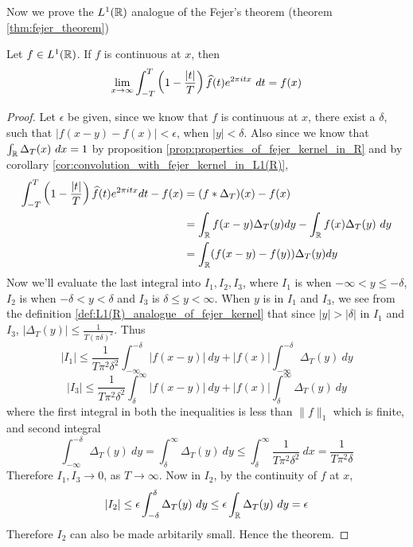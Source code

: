 Now we prove the $L^1(\mathbb R)$ analogue of the Fejer's theorem (theorem \ref{thm:fejer_theorem})
\begin{theorem}
  \label{thm:L1(R)_analogue_of_fejer_theorem}
  Let $f \in L^1(\mathbb R)$. If $f$ is continuous at $x$, then $$\lim_{x \to \infty} \int_{-T}^{T}\left(1-\frac{|t|}{T}\right)\widehat{f}(t)e^{2\pi itx} \ dt = f(x)$$
\end{theorem}
\begin{proof}
  Let $\epsilon$ be given, since we know that $f$ is continuous at $x$, there exist a $\delta$, such that $|f(x-y) - f(x)| < \epsilon$, when $|y| < \delta$. Also since we know that $\int_\R \Delta_T(x) \ dx = 1$ by proposition \ref{prop:properties_of_fejer_kernel_in_R} and by corollary \ref{cor:convolution_with_fejer_kernel_in_L1(R)},
  \begin{align*}
    \int_{-T}^T\left(1-\frac{|t|}{T}\right)\widehat{f}(t)e^{2\pi itx} dt - f(x) &= (f*\Delta_T)(x) - f(x) \\
     &= \int_\mathbb R f(x-y) \Delta_T(y) dy - \int_\mathbb R f(x)\Delta_T(y) \ dy \\
     &= \int_\mathbb R (f(x-y) - f(y)) \Delta_T(y) dy \\ 
  \end{align*}
  Now we'll evaluate the last integral into $I_1, I_2, I_3$, where $I_1$ is when $-\infty<y\le-\delta$, $I_2$ is when $-\delta < y < \delta$ and $I_3$ is $\delta \le y < \infty$. When $y$ is in $I_1$ and $I_3$, we see from the definition \ref{def:L1(R)_analogue_of_fejer_kernel} that since $|y| > |\delta|$ in $I_1$ and $I_3$, $|\Delta_T(y)| \le \frac{1}{T(\pi\delta)^2}$. Thus $$|I_1| \le \frac{1}{T\pi^2\delta^2}\int_{-\infty}^{-\delta} |f(x-y)| \ dy + |f(x)|\int_{-\infty}^{-\delta}\Delta_T(y) \ dy $$ $$|I_3| \le \frac{1}{T\pi^2\delta^2}\int^{\infty}_{\delta} |f(x-y)| \ dy + |f(x)|\int^{\infty}_{\delta}\Delta_T(y) \ dy $$
  where the first integral in both the inequalities is less than $\|f\|_1$ which is finite, and second integral $$\int_{-\infty}^{-\delta} \Delta_T(y) \ dy = \int_\delta^\infty \Delta_T(y) \ dy \le \int_\delta^\infty \frac{1}{T\pi^2 \delta^2} \ dx = \frac{1}{T\pi^2 \delta}$$
  Therefore $I_1, I_3 \to 0$, as $T\to \infty$. Now in $I_2$, by the continuity of $f$ at $x$, $$|I_2| \le \epsilon\int_{-\delta}^\delta \Delta_T(y) \ dy \le \epsilon \int_\mathbb R \Delta_T(y) \ dy = \epsilon$$
  Therefore $I_2$ can also be made arbitarily small. Hence the theorem. 
\end{proof}

